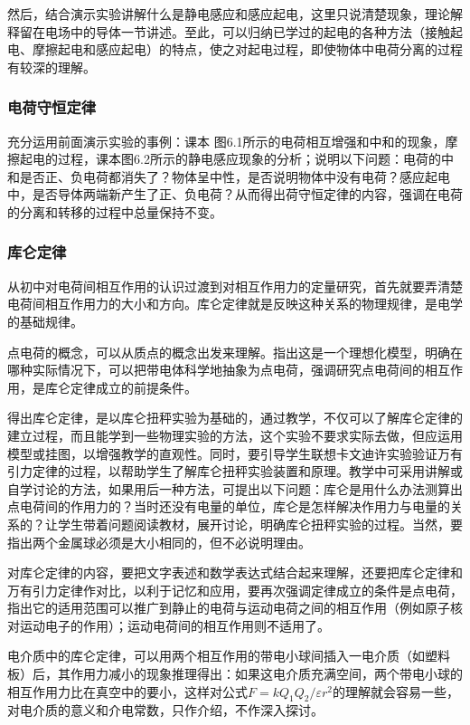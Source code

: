 然后，结合演示实验讲解什么是静电感应和感应起电，这里只说清楚现象，理论解释留在电场中的导体一节讲述。至此，可以归纳已学过的起电的各种方法（接触起电、摩擦起电和感应起电）的特点，使之对起电过程，即使物体中电荷分离的过程有较深的理解。

\subsubsection{电荷守恒定律}

充分运用前面演示实验的事例：课本
图6.1所示的电荷相互增强和中和的现象，摩擦起电的过程，课本图6.2所示的静电感应现象的分析；说明以下问题：电荷的中和是否正、负电荷都消失了？物体呈中性，是否说明物体中没有电荷？感应起电中，是否导体两端新产生了正、负电荷？从而得出荷守恒定律的内容，强调在电荷的分离和转移的过程中总量保持不变。

\subsubsection{库仑定律}

从初中对电荷间相互作用的认识过渡到对相互作用力的定量研究，首先就要弄清楚电荷间相互作用力的大小和方向。库仑定律就是反映这种关系的物理规律，是电学的基础规律。

点电荷的概念，可以从质点的概念出发来理解。指出这是一个理想化模型，明确在哪种实际情况下，可以把带电体科学地抽象为点电荷，强调研究点电荷间的相互作用，是库仑定律成立的前提条件。

得出库仑定律，是以库仑扭秤实验为基础的，通过教学，不仅可以了解库仑定律的建立过程，而且能学到一些物理实验的方法，这个实验不要求实际去做，但应运用模型或挂图，以增强教学的直观性。同时，要引导学生联想卡文迪许实验验证万有引力定律的过程，以帮助学生了解库仑扭秤实验装置和原理。教学中可采用讲解或自学讨论的方法，如果用后一种方法，可提出以下问题：库仑是用什么办法测算出点电荷间的作用力的？当时还没有电量的单位，库仑是怎样解决作用力与电量的关系的？让学生带着问题阅读教材，展开讨论，明确库仑扭秤实验的过程。当然，要指出两个金属球必须是大小相同的，但不必说明理由。

对库仑定律的内容，要把文字表述和数学表达式结合起来理解，还要把库仑定律和万有引力定律作对比，以利于记忆和应用，要再次强调定律成立的条件是点电荷，指出它的适用范围可以推广到静止的电荷与运动电荷之间的相互作用（例如原子核对运动电子的作用）；运动电荷间的相互作用则不适用了。

电介质中的库仑定律，可以用两个相互作用的带电小球间插入一电介质（如塑料板）后，其作用力减小的现象推理得出：如果这电介质充满空间，两个带电小球的相互作用力比在真空中的要小，这样对公式$F=kQ_1Q_2/\varepsilon r^2$的理解就会容易一些，对电介质的意义和介电常数，只作介绍，不作深入探讨。

